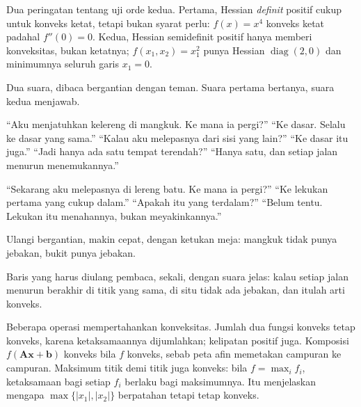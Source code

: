 Dua peringatan tentang uji orde kedua. Pertama, Hessian \emph{definit} positif cukup
untuk konveks ketat, tetapi bukan syarat perlu: $f(x)=x^{4}$ konveks ketat padahal
$f''(0)=0$. Kedua, Hessian semidefinit positif hanya memberi konveksitas, bukan ketatnya;
$f(x_{1},x_{2})=x_{1}^{2}$ punya Hessian $\operatorname{diag}(2,0)$ dan minimumnya
seluruh garis $x_{1}=0$.

\begin{bacakeras}
Dua suara, dibaca bergantian dengan teman. Suara pertama bertanya, suara kedua menjawab.

``Aku menjatuhkan kelereng di mangkuk. Ke mana ia pergi?'' ``Ke dasar. Selalu ke dasar
yang sama.'' ``Kalau aku melepasnya dari sisi yang lain?'' ``Ke dasar itu juga.'' ``Jadi
hanya ada satu tempat terendah?'' ``Hanya satu, dan setiap jalan menurun menemukannya.''

``Sekarang aku melepasnya di lereng batu. Ke mana ia pergi?'' ``Ke lekukan pertama yang
cukup dalam.'' ``Apakah itu yang terdalam?'' ``Belum tentu. Lekukan itu menahannya, bukan
meyakinkannya.''

Ulangi bergantian, makin cepat, dengan ketukan meja: mangkuk tidak punya jebakan, bukit
punya jebakan.

Baris yang harus diulang pembaca, sekali, dengan suara jelas: kalau setiap jalan menurun
berakhir di titik yang sama, di situ tidak ada jebakan, dan itulah arti konveks.
\end{bacakeras}

Beberapa operasi mempertahankan konveksitas. Jumlah dua fungsi konveks tetap konveks,
karena ketaksamaannya dijumlahkan; kelipatan positif juga. Komposisi
$f(\mathbf{A}\mathbf{x}+\mathbf{b})$ konveks bila $f$ konveks, sebab peta afin memetakan
campuran ke campuran. Maksimum titik demi titik juga konveks: bila $f=\max_{i}f_{i}$,
ketaksamaan bagi setiap $f_{i}$ berlaku bagi maksimumnya. Itu menjelaskan mengapa
$\max\{|x_{1}|,|x_{2}|\}$ berpatahan tetapi tetap konveks.

